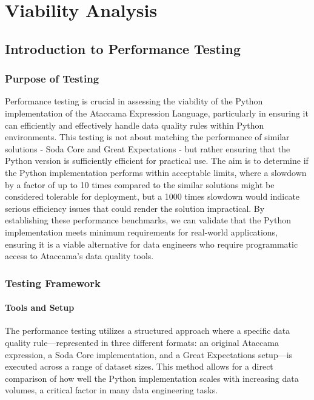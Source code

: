 
\chapter{Viability Analysis}


\section{Introduction to Performance Testing}

\subsection{Purpose of Testing}


Performance testing is crucial in assessing the viability of the Python implementation of the Ataccama Expression Language, particularly in ensuring it can efficiently and effectively handle data quality rules within Python environments. This testing is not about matching the performance of similar solutions - Soda Core and Great Expectations -  but rather ensuring that the Python version is sufficiently efficient for practical use. The aim is to determine if the Python implementation performs within acceptable limits, where a slowdown by a factor of up to 10 times compared to the similar solutions might be considered tolerable for deployment, but a 1000 times slowdown would indicate serious efficiency issues that could render the solution impractical. By establishing these performance benchmarks, we can validate that the Python implementation meets minimum requirements for real-world applications, ensuring it is a viable alternative for data engineers who require programmatic access to Ataccama's data quality tools.

\subsection{Testing Framework}

\subsubsection{Tools and Setup}

The performance testing utilizes a structured approach where a specific data quality rule—represented in three different formats: an original Ataccama expression, a Soda Core implementation, and a Great Expectations setup—is executed across a range of dataset sizes. This method allows for a direct comparison of how well the Python implementation scales with increasing data volumes, a critical factor in many data engineering tasks.

